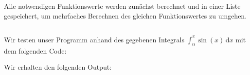 \section{}





\subsection{}

Alle notwendigen Funktionswerte werden zunächst berechnet und in einer Liste gespeichert, um mehrfaches Berechnen des gleichen Funktionswertes zu umgehen.







\subsection{}

Wir testen unser Programm anhand des gegebenen Integrals $\int_0^\pi \sin(x) \,\text{d}x$ mit dem folgenden Code:



Wir erhalten den folgenden Output:

